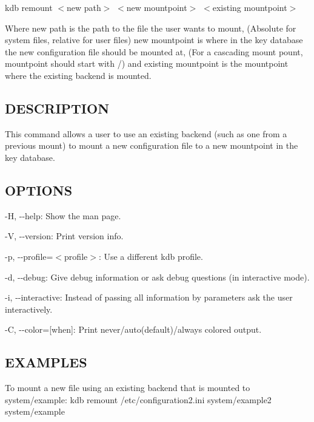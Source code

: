 {\ttfamily kdb remount $<$new path$>$ $<$new mountpoint$>$ $<$existing mountpoint$>$}

Where {\ttfamily new path} is the path to the file the user wants to mount, (Absolute for system files, relative for user files) {\ttfamily new mountpoint} is where in the key database the new configuration file should be mounted at, (For a cascading mount pount, {\ttfamily mountpoint} should start with {\ttfamily /}) and {\ttfamily existing mountpoint} is the mountpoint where the existing backend is mounted.

\subsection*{D\+E\+S\+C\+R\+I\+P\+T\+I\+O\+N}

This command allows a user to use an existing backend (such as one from a previous mount) to mount a new configuration file to a new mountpoint in the key database.

\subsection*{O\+P\+T\+I\+O\+N\+S}


\begin{DoxyItemize}
\item {\ttfamily -\/\+H}, {\ttfamily -\/-\/help}\+: Show the man page.
\item {\ttfamily -\/\+V}, {\ttfamily -\/-\/version}\+: Print version info.
\item {\ttfamily -\/p}, {\ttfamily -\/-\/profile}=$<$profile$>$\+: Use a different kdb profile.
\item {\ttfamily -\/d}, {\ttfamily -\/-\/debug}\+: Give debug information or ask debug questions (in interactive mode).
\item {\ttfamily -\/i}, {\ttfamily -\/-\/interactive}\+: Instead of passing all information by parameters ask the user interactively.
\item {\ttfamily -\/\+C}, {\ttfamily -\/-\/color}=\mbox{[}when\mbox{]}\+: Print never/auto(default)/always colored output.
\end{DoxyItemize}

\subsection*{E\+X\+A\+M\+P\+L\+E\+S}

To mount a new file using an existing backend that is mounted to {\ttfamily system/example}\+: {\ttfamily kdb remount /etc/configuration2.ini system/example2 system/example} 